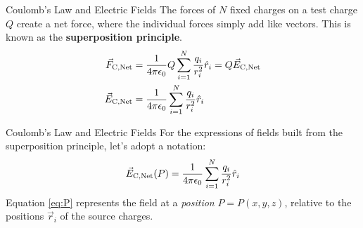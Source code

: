 \documentclass{beamer}
\begin{document}
\begin{frame}{Coulomb’s Law and Electric Fields}
The forces of $N$ fixed charges on a test charge $Q$ create a net force, where the individual forces simply add like vectors.  This is known as the \textbf{superposition principle}.
\begin{align}
\vec{F}_{\rm C,Net} &= \frac{1}{4\pi\epsilon_{\rm 0}} Q \sum_{i = 1}^N \frac{q_i}{r_i^2}\hat{r}_i = Q \vec{E}_{\rm C,Net} \\
\vec{E}_{\rm C,Net} &= \frac{1}{4\pi\epsilon_{\rm 0}} \sum_{i = 1}^N \frac{q_i}{r_i^2}\hat{r}_i
\end{align}
\end{frame}

\begin{frame}{Coulomb’s Law and Electric Fields}
For the expressions of fields built from the superposition principle, let's adopt a notation:
\begin{equation}
\vec{E}_{\rm C,Net}(P) = \frac{1}{4\pi\epsilon_{\rm 0}} \sum_{i = 1}^N \frac{q_i}{r_i^2}\hat{r}_i \label{eq:P}
\end{equation}
Equation \ref{eq:P} represents the field at a \textit{position} $P = P(x,y,z)$, relative to the positions $\vec{r}_i$ of the source charges.
\end{frame}
\end{document}
